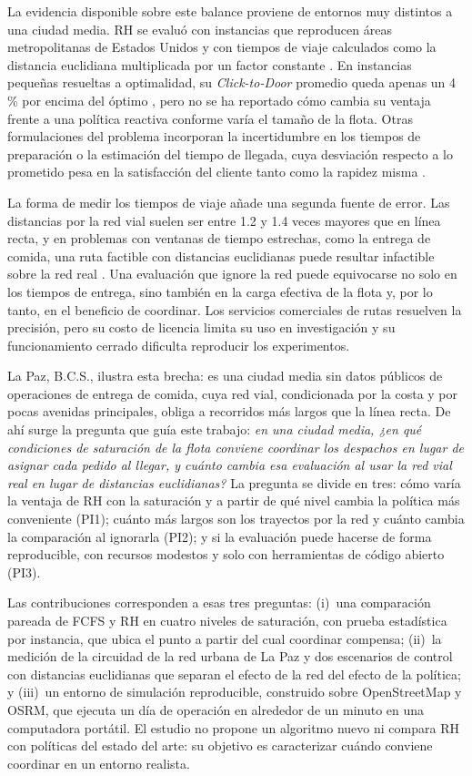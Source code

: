 \documentclass[10pt]{article}
\begin{document}
La evidencia disponible sobre este balance proviene de entornos muy distintos a una ciudad media. RH
se evaluó con instancias que reproducen áreas metropolitanas de Estados Unidos y con tiempos de viaje
calculados como la distancia euclidiana multiplicada por un factor constante \cite{Reyes2018}. En
instancias pequeñas resueltas a optimalidad, su \textit{Click-to-Door} promedio queda apenas un
4\,\% por encima del óptimo \cite{Yildiz2019}, pero no se ha reportado cómo cambia su ventaja frente
a una política reactiva conforme varía el tamaño de la flota. Otras formulaciones del problema
incorporan la incertidumbre en los tiempos de preparación \cite{Ulmer2021} o la estimación del tiempo
de llegada, cuya desviación respecto a lo prometido pesa en la satisfacción del cliente tanto como la
rapidez misma \cite{Hildebrandt2022}.

La forma de medir los tiempos de viaje añade una segunda fuente de error. Las distancias por la red
vial suelen ser entre 1.2 y 1.4 veces mayores que en línea recta, y en problemas con ventanas de
tiempo estrechas, como la entrega de comida, una ruta factible con distancias euclidianas puede
resultar infactible sobre la red real \cite{Boyaci2021}. Una evaluación que ignore la red puede
equivocarse no solo en los tiempos de entrega, sino también en la carga efectiva de la flota y, por
lo tanto, en el beneficio de coordinar. Los servicios comerciales de rutas resuelven la precisión,
pero su costo de licencia limita su uso en investigación \cite{Pereira2021} y su funcionamiento
cerrado dificulta reproducir los experimentos.

La Paz, B.C.S., ilustra esta brecha: es una ciudad media sin datos públicos de operaciones de entrega
de comida, cuya red vial, condicionada por la costa y por pocas avenidas principales, obliga a
recorridos más largos que la línea recta. De ahí surge la pregunta que guía este trabajo:
\textit{en una ciudad media, ¿en qué condiciones de saturación de la flota conviene coordinar los
despachos en lugar de asignar cada pedido al llegar, y cuánto cambia esa evaluación al usar la red
vial real en lugar de distancias euclidianas?} La pregunta se divide en tres: cómo varía la ventaja
de RH con la saturación y a partir de qué nivel cambia la política más conveniente (PI1); cuánto más largos son los
trayectos por la red y cuánto cambia la comparación al ignorarla (PI2); y si la evaluación puede
hacerse de forma reproducible, con recursos modestos y solo con herramientas de código abierto (PI3).

Las contribuciones corresponden a esas tres preguntas: (i)~una comparación pareada de FCFS y RH en
cuatro niveles de saturación, con prueba estadística por instancia, que ubica el punto a partir del
cual coordinar compensa; (ii)~la medición de la circuidad de la red urbana de La Paz y dos escenarios
de control con distancias euclidianas que separan el efecto de la red del efecto de la política; y
(iii)~un entorno de simulación reproducible, construido sobre OpenStreetMap y OSRM, que ejecuta un
día de operación en alrededor de un minuto en una computadora portátil. El estudio no propone un
algoritmo nuevo ni compara RH con políticas del estado del arte: su objetivo es caracterizar cuándo
conviene coordinar en un entorno realista.
\end{document}
